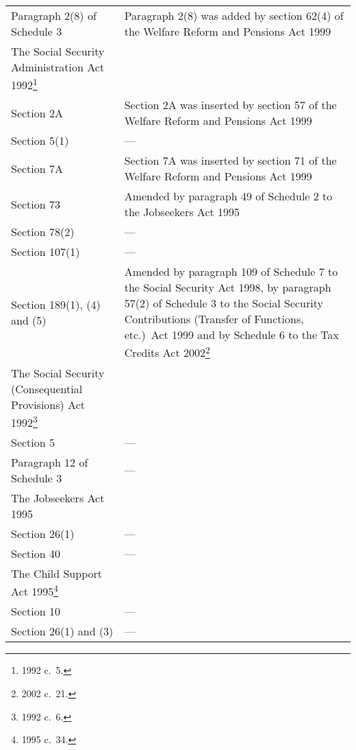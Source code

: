 \documentclass[12pt,a4paper]{article}
\begin{document}
{\begin{longtable}{p{97.9536pt}p{268.04297pt}}
\hspace{1em}Paragraph 2(8) of \hspace*{1em}Schedule 3	&Paragraph 2(8) was added by section 62(4) of the Welfare Reform and Pensions Act 1999\\
The Social Security Administration Act 1992\footnote{1992 c.\ 5.}\\	
\hspace{1em}Section 2A	&Section 2A was inserted by section 57 of the Welfare Reform and Pensions Act 1999\\
\hspace{1em}Section 5(1)	&—\\
\hspace{1em}Section 7A	&Section 7A was inserted by section 71 of the Welfare Reform and Pensions Act 1999\\
\hspace{1em}Section 73	&Amended by paragraph 49 of Schedule 2 to the Jobseekers Act 1995\\
\hspace{1em}Section 78(2)	&—\\
\hspace{1em}Section 107(1)	&—\\
\hspace{1em}Section 189(1), (4) \hspace*{1em}and (5)	&Amended by paragraph 109 of Schedule 7 to the Social Security Act 1998, by paragraph 57(2) of Schedule 3 to the Social Security Contributions (Transfer of Functions, etc.)\ Act 1999 and by Schedule 6 to the Tax Credits Act 2002\footnote{2002 c.\ 21.}\\
The Social Security (Consequential Provisions) Act 1992\footnote{1992 c.\ 6.}	\\
\hspace{1em}Section 5	&—\\
\hspace{1em}Paragraph 12 of \hspace*{1em}Schedule 3	&—\\
The Jobseekers Act 1995	\\
\hspace{1em}Section 26(1)	&—\\
\hspace{1em}Section 40	&—\\
The Child Support Act 1995\footnote{1995 c.\ 34.}	\\
\hspace{1em}Section 10	&—\\
\hspace{1em}Section 26(1) and \hspace*{1em}(3)	&—\\

\end{longtable}}
\end{document}
